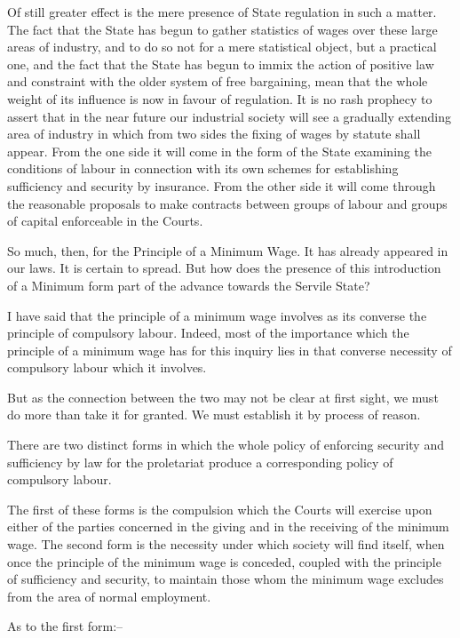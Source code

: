 \documentclass{book}
\begin{document}
Of still greater effect is the mere presence of State regulation in such a matter. The fact that the State has begun to gather statistics of wages over these large areas of industry, and to do so not for a mere statistical object, but a practical one, and the fact that the State has begun to immix the action of positive law and constraint with the older system of free bargaining, mean that the whole weight of its influence is now in favour of regulation. It is no rash prophecy to assert that in the near future our industrial society will see a gradually extending area of industry in which from two sides the fixing of wages by statute shall appear. From the one side it will come in the form of the State examining the conditions of labour in connection with its own schemes for establishing sufficiency and security by insurance. From the other side it will come through the reasonable proposals to make contracts between groups of labour and groups of capital enforceable in the Courts.

So much, then, for the Principle of a Minimum Wage. It has already appeared in our laws. It is certain to spread. But how does the presence of this introduction of a Minimum form part of the advance towards the Servile State?

I have said that the principle of a minimum wage involves as its converse the principle of compulsory labour. Indeed, most of the importance which the principle of a minimum wage has for this inquiry lies in that converse necessity of compulsory labour which it involves.

But as the connection between the two may not be clear at first sight, we must do more than take it for granted. We must establish it by process of reason.

There are two distinct forms in which the whole policy of enforcing security and sufficiency by law for the proletariat produce a corresponding policy of compulsory labour.

The first of these forms is the compulsion which the Courts will exercise upon either of the parties concerned in the giving and in the receiving of the minimum wage. The second form is the necessity under which society will find itself, when once the principle of the minimum wage is conceded, coupled with the principle of sufficiency and security, to maintain those whom the minimum wage excludes from the area of normal employment.

As to the first form:–
\end{document}
